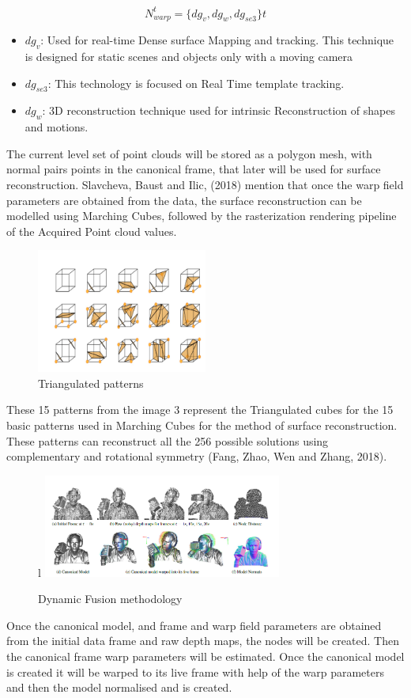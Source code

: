 \documentclass[a4paper]{article}
\begin{document}
\[N_{warp}^t=\{dg_v,dg_w,dg_{se3}\}t\]
\begin{itemize}[label =]
    \item $dg_{v}$: Used for real-time Dense surface Mapping and tracking. This technique is designed for static scenes and objects only with a moving camera
    \item $dg_{se3}$: This technology is focused on Real Time template tracking.
    \item $dg_{w}$: 3D reconstruction technique used for intrinsic Reconstruction of shapes and motions. 
\end{itemize}
The current level set of point clouds will be stored as a polygon mesh, with normal pairs points in the canonical frame, that later will be used for surface reconstruction.   
Slavcheva, Baust and Ilic, (2018)  mention that once the warp field parameters are obtained from the data, the surface reconstruction can be modelled using Marching Cubes, followed by the rasterization rendering pipeline of the Acquired Point cloud values.\\
\begin{figure} %
    \centering
    \includegraphics[width=0.5\textwidth]{shapes.png}
    \caption{Triangulated patterns \cite[]{fang_zhao_wen_zhang_2018}}
\end{figure}
These 15 patterns from the image 3 represent the Triangulated cubes for the 15 basic patterns used in Marching Cubes for the method of surface reconstruction. These patterns can reconstruct all the 256 possible solutions using complementary and rotational symmetry (Fang, Zhao, Wen and Zhang, 2018).
\begin{figure}{l} %
    \centering
    \includegraphics[width=0.7\textwidth]{dynamicfusion2.png}
    \caption{Dynamic Fusion methodology \cite[]{newcombe_fox_seitz_2015}}
\end{figure}
Once the canonical model, and frame and warp field parameters are obtained from the initial data frame and raw depth maps, the nodes will be created. Then the canonical frame warp parameters will be estimated. Once the canonical model is created it will be warped to its live frame with help of the warp parameters and then the model normalised and is created. \\
\enlargethispage{\baselineskip}
\end{document}
